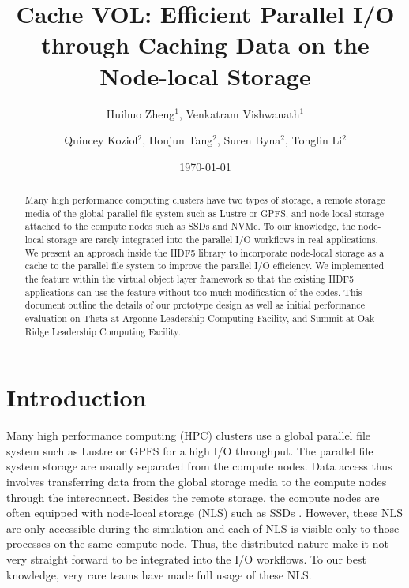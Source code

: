 \documentclass[aps, rmp, 11pt, notitlepage]{revtex4-1}
\begin{document}
\title{Cache VOL: Efficient Parallel I/O through Caching Data on the Node-local Storage}
\author{Huihuo Zheng$^1$, Venkatram Vishwanath$^1$}
\author{Quincey Koziol$^2$, Houjun Tang$^2$, Suren Byna$^2$, Tonglin Li$^2$}
\date{\today}
\begin{abstract}
Many high performance computing clusters have two types of storage, a remote storage media of the global parallel file system such as Lustre or GPFS, and node-local storage attached to the compute nodes such as SSDs and NVMe. To our knowledge, the node-local storage are rarely integrated into the parallel I/O workflows in real applications. We present an approach inside the HDF5 library to incorporate node-local storage as a cache to the parallel file system to improve the parallel I/O efficiency. We implemented the feature within the virtual object layer framework so that the existing HDF5 applications can use the feature without too much modification of the codes. This document outline the details of our prototype design as well as initial performance evaluation on Theta at Argonne Leadership Computing Facility, and Summit at Oak Ridge Leadership Computing Facility. 
\end{abstract}
\maketitle
\section{Introduction}
\label{sec:intro}
Many high performance computing (HPC) clusters use a global parallel file system such as Lustre or GPFS for a high I/O throughput. The parallel file system storage are usually separated from the compute nodes. Data access thus involves transferring data from the global storage media to the compute nodes through the interconnect. Besides the remote storage, the compute nodes are often equipped with node-local storage (NLS) such as SSDs \cite{theta, summit}.
However, these NLS are only accessible during the simulation and each of NLS is visible only to those processes on the same compute node. Thus, the distributed nature make it not very straight forward to be integrated into the I/O workflows. To our best knowledge, very rare teams have made full usage of these NLS. 
\end{document}
